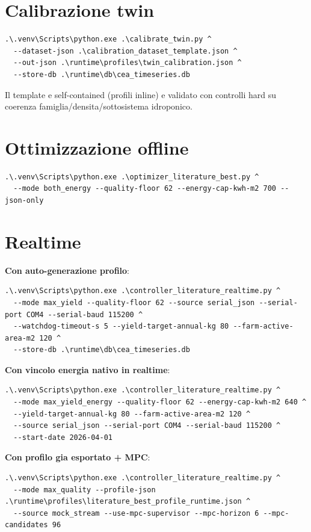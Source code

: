 ﻿\documentclass[11pt,a4paper]{report}
\begin{document}
\section{Calibrazione twin}
\begin{lstlisting}
.\.venv\Scripts\python.exe .\calibrate_twin.py ^
  --dataset-json .\calibration_dataset_template.json ^
  --out-json .\runtime\profiles\twin_calibration.json ^
  --store-db .\runtime\db\cea_timeseries.db
\end{lstlisting}
Il template e self-contained (profili inline) e validato con controlli hard su coerenza famiglia/densita/sottosistema idroponico.

\section{Ottimizzazione offline}
\begin{lstlisting}
.\.venv\Scripts\python.exe .\optimizer_literature_best.py ^
  --mode both_energy --quality-floor 62 --energy-cap-kwh-m2 700 --json-only
\end{lstlisting}

\section{Realtime}
\textbf{Con auto-generazione profilo}:
\begin{lstlisting}
.\.venv\Scripts\python.exe .\controller_literature_realtime.py ^
  --mode max_yield --quality-floor 62 --source serial_json --serial-port COM4 --serial-baud 115200 ^
  --watchdog-timeout-s 5 --yield-target-annual-kg 80 --farm-active-area-m2 120 ^
  --store-db .\runtime\db\cea_timeseries.db
\end{lstlisting}

\textbf{Con vincolo energia nativo in realtime}:
\begin{lstlisting}
.\.venv\Scripts\python.exe .\controller_literature_realtime.py ^
  --mode max_yield_energy --quality-floor 62 --energy-cap-kwh-m2 640 ^
  --yield-target-annual-kg 80 --farm-active-area-m2 120 ^
  --source serial_json --serial-port COM4 --serial-baud 115200 ^
  --start-date 2026-04-01
\end{lstlisting}

\textbf{Con profilo gia esportato + MPC}:
\begin{lstlisting}
.\.venv\Scripts\python.exe .\controller_literature_realtime.py ^
  --mode max_quality --profile-json .\runtime\profiles\literature_best_profile_runtime.json ^
  --source mock_stream --use-mpc-supervisor --mpc-horizon 6 --mpc-candidates 96
\end{lstlisting}
\end{document}

